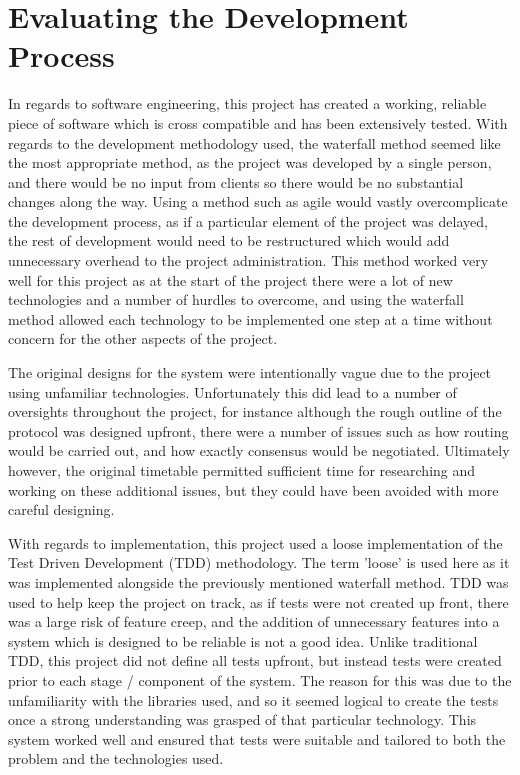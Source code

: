 \documentclass[a4paper, 11pt]{report}
\begin{document}
\section{Evaluating the Development Process}
In regards to software engineering, this project has created a working, reliable piece of software which is cross compatible and has been extensively tested. With regards to the development methodology used, the waterfall method seemed like the most appropriate method, as the project was developed by a single person, and there would be no input from clients so there would be no substantial changes along the way. Using a method such as agile would vastly overcomplicate the development process, as if a particular element of the project was delayed, the rest of development would need to be restructured which would add unnecessary overhead to the project administration. This method worked very well for this project as at the start of the project there were a lot of new technologies and a number of hurdles to overcome, and using the waterfall method allowed each technology to be implemented one step at a time without concern for the other aspects of the project.

The original designs for the system were intentionally vague due to the project using unfamiliar technologies. Unfortunately this did lead to a number of oversights throughout the project, for instance although the rough outline of the protocol was designed upfront, there were a number of issues such as how routing would be carried out, and how exactly consensus would be negotiated. Ultimately however, the original timetable permitted sufficient time for researching and working on these additional issues, but they could have been avoided with more careful designing.

With regards to implementation, this project used a loose implementation of the Test Driven Development (TDD) methodology. The term 'loose' is used here as it was implemented alongside the previously mentioned waterfall method. TDD was used to help keep the project on track, as if tests were not created up front, there was a large risk of feature creep, and the addition of unnecessary features into a system which is designed to be reliable is not a good idea. Unlike traditional TDD, this project did not define all tests upfront, but instead tests were created prior to each stage / component of the system. The reason for this was due to the unfamiliarity with the libraries used, and so it seemed logical to create the tests once a strong understanding was grasped of that particular technology. This system worked well and ensured that tests were suitable and tailored to both the problem and the technologies used.
\end{document}
